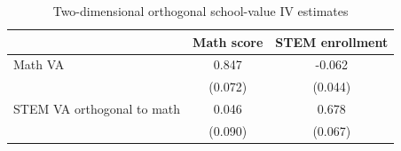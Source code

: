 \begin{table}[!htbp]
\centering
\caption{Two-dimensional orthogonal school-value IV estimates}
\label{tab:orthogonal_school_va_iv_2x2}
\begin{tabular}{lcc}
\toprule
 & Math score & STEM enrollment \\
\midrule
Math VA & 0.847 & -0.062 \\
 & (0.072) & (0.044) \\
STEM VA orthogonal to math & 0.046 & 0.678 \\
 & (0.090) & (0.067) \\
\bottomrule
\end{tabular}
\end{table}
